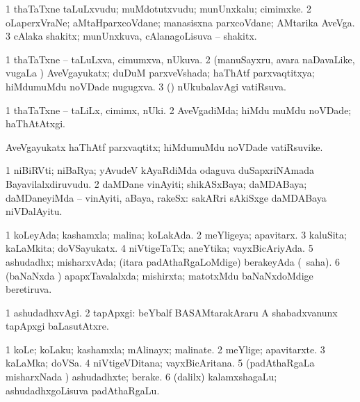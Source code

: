 \bentry
{}
\gl{\nA}
\bmng
\bnum
\num{1} thaTaTxne taLuLxvudu; muMdotutxvudu; munUnxkalu; cimimxke. 
\num{2} oLaperxVraNe; aMtaHparxcoVdane; manasisxna parxcoVdane; AMtarika AveVga. 
\num{3} cAlaka shakitx; munUnxkuva, cAlanagoLisuva -- shakitx. 
\enum
\emng
\eentry

\bentry
{}
\gl{\gu}
\bmng
\bnum
\num{1} thaTaTxne -- taLuLxva, cimumxva, nUkuva. 
\num{2} (manuSayxru, avara naDavaLike, \mo vugaLa \vi) AveVgayukatx; duDuM parxveVshada; haThAtf parxvaqtitxya; hiMdumuMdu noVDade nugugxva. 
\num{3} (\Bwvi) nUkubalavAgi vatiRsuva. 
\enum
\emng
\eentry

\bentry
{}
\gl{\kirxvi}
\bmng
\bnum
\num{1} thaTaTxne -- taLiLx, cimimx, nUki. 
\num{2} AveVgadiMda; hiMdu muMdu noVDade; haThAtAtxgi. 
\enum
\emng
\eentry

\bentry
{}
\gl{\nA}
\bmng
AveVgayukatx haThAtf parxvaqtitx; hiMdumuMdu noVDade vatiRsuvike. 
\emng
\eentry

\bentry
{}
\gl{\nA}
\bmng
\bnum
\num{1} niBiRVti; niBaRya; yAvudeV kAyaRdiMda odaguva duSapxriNAmada Bayavilalxdiruvudu. 
\num{2} daMDane vinAyiti; shikASxBaya; daMDABaya; daMDaneyiMda -- vinAyiti, aBaya, rakeSx:  sakARri sAkiSxge daMDABaya niVDalAyitu. 
\enum
\emng
\eentry

\bentry
{}
\gl{\gu}
\bmng
\bnum
\num{1} koLeyAda; kashamxla; malina; koLakAda. 
\num{2} meYligeya; apavitarx. 
\num{3} kaluSita; kaLaMkita; doVSayukatx. 
\num{4} niVtigeTaTx; aneYtika; vayxBicAriyAda. 
\num{5} ashudadhx; misharxvAda; (itara padAthaRgaLoMdige) berakeyAda (\rUpa\ saha). 
\num{6} (baNaNxda \vi) apapxTavalalxda; mishirxta; matotxMdu baNaNxdoMdige beretiruva. 
\enum
\emng
\eentry

\bentry
{}
\gl{\kirxvi}
\bmng
\bnum
\num{1} ashudadhxvAgi. 
\num{2} tapApxgi:  beYbalf BASAMtarakAraru A shabadxvanunx tapApxgi baLasutAtxre. 
\enum
\emng
\eentry

\bentry
{}
\gl{\nA}
\bmng
\bnum
\num{1} koLe; koLaku; kashamxla; mAlinayx; malinate. 
\num{2} meYlige; apavitarxte. 
\num{3} kaLaMka; doVSa. 
\num{4} niVtigeVDitana; vayxBicAritana. 
\num{5} (padAthaRgaLa misharxNada \vi) ashudadhxte; berake. 
\num{6} (\bava dalilx) kalamxshagaLu; ashudadhxgoLisuva padAthaRgaLu. 
\enum
\emng
\eentry

